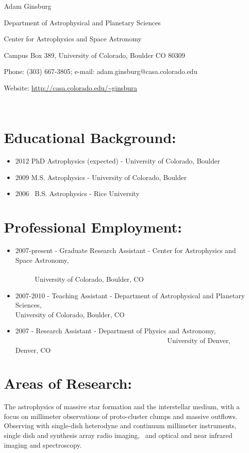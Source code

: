 \documentclass{article}
\begin{document}
\begin{centering}
\par Adam Ginsburg 
\par Department of Astrophysical and Planetary Sciences 
\par Center for Astrophysics and Space Astronomy 
\par Campus Box 389, University of Colorado, Boulder CO 80309 
\par Phone: (303) 667-3805; e-mail: adam.ginsburg@casa.colorado.edu 
\par \hspace{20mm} Website: \url{http://casa.colorado.edu/~ginsbura}
\end{centering}
  
\section*{Educational Background: }
\begin{itemize}
    \item 2012 PhD Astrophysics (expected) - University of Colorado, Boulder 
    \item 2009 M.S. Astrophysics - University of Colorado, Boulder 
    \item 2006  B.S. Astrophysics - Rice University 
\end{itemize}


\section*{Professional Employment:}
\begin{itemize}
    \item 2007-present - Graduate Research Assistant - Center for Astrophysics and Space Astronomy, 
                                                                          University of Colorado, Boulder, CO 
    \item 2007-2010    - Teaching Assistant - Department of Astrophysical and Planetary Sciences, 
                                                              University of Colorado, Boulder, CO 
    \item 2007 - Research Assistant - Department of Physics and Astronomy, 
                                                 University of Denver, Denver, CO 
\end{itemize}

\section*{Areas of Research: }
The astrophysics of massive star formation and the interstellar medium, with a
focus on millimeter observations of proto-cluster clumps and massive outflows. 
Observing with single-dish heterodyne and continuum millimeter instruments,
single dish and synthesis array radio imaging,  and optical and near infrared
imaging and spectroscopy.  
\end{document}

